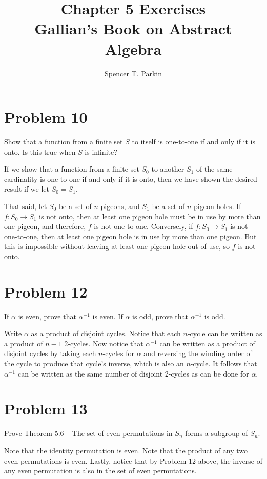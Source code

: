 \documentclass[12pt]{article}
\title{Chapter 5 Exercises\\Gallian's Book on Abstract Algebra}
\author{Spencer T. Parkin}
\begin{document}
\maketitle

\section*{Problem 10}

Show that a function from a finite set $S$ to itself is one-to-one
if and only if it is onto.  Is this true when $S$ is infinite?

If we show that a function from a finite set $S_0$ to another
$S_1$ of the same cardinality is one-to-one if and only if
it is onto, then we have shown the desired result if
we let $S_0=S_1$.

That said, let $S_0$ be a set of $n$ pigeons, and $S_1$
be a set of $n$ pigeon holes.  If $f:S_0\to S_1$ is
not onto, then at least one pigeon hole must be in use
by more than one pigeon, and therefore, $f$ is not one-to-one.
Conversely, if $f:S_0\to S_1$ is not one-to-one, then at
least one pigeon hole is in use by more than one pigeon.
But this is impossible without leaving at least one pigeon hole
out of use, so $f$ is not onto.

\section*{Problem 12}

If $\alpha$ is even, prove that $\alpha^{-1}$ is even.
If $\alpha$ is odd, prove that $\alpha^{-1}$ is odd.

Write $\alpha$ as a product of disjoint cycles.
Notice that each $n$-cycle can be written as
a product of $n-1$ 2-cycles.  Now notice that
$\alpha^{-1}$ can be written as a product of
disjoint cycles by taking each $n$-cycles for $\alpha$
and reversing the winding order of the cycle to
produce that cycle's inverse, which is also an $n$-cycle.
It follows that $\alpha^{-1}$ can be written as the
same number of disjoint 2-cycles as can be done
for $\alpha$.

\section*{Problem 13}

Prove Theorem 5.6 -- The set of even permutations in $S_n$ forms
a subgroup of $S_n$.

Note that the identity permutation is even.  Note that the product
of any two even permutations is even.  Lastly, notice that
by Problem 12 above, the inverse of any even permutation
is also in the set of even permutations.
\end{document}

